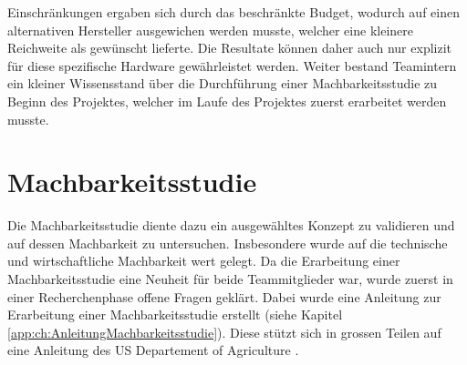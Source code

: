 Einschränkungen ergaben sich durch das beschränkte Budget, wodurch auf einen alternativen Hersteller ausgewichen werden musste, welcher eine kleinere Reichweite als gewünscht lieferte. Die Resultate können daher auch nur explizit für diese spezifische Hardware gewährleistet werden.
Weiter bestand Teamintern ein kleiner Wissensstand über die Durchführung einer Machbarkeitsstudie zu Beginn des Projektes, welcher im Laufe des Projektes zuerst erarbeitet werden musste.

\section{Machbarkeitsstudie}
Die Machbarkeitsstudie diente dazu ein ausgewähltes Konzept zu validieren und auf dessen Machbarkeit zu untersuchen. Insbesondere wurde auf die technische und wirtschaftliche Machbarkeit wert gelegt. Da die Erarbeitung einer Machbarkeitsstudie eine Neuheit für beide Teammitglieder war, wurde zuerst in einer Recherchenphase offene Fragen geklärt. Dabei wurde eine Anleitung zur Erarbeitung einer Machbarkeitsstudie erstellt (siehe Kapitel \ref{app:ch:AnleitungMachbarkeitsstudie}). Diese stützt sich in grossen Teilen auf eine Anleitung des US Departement of Agriculture \parencite{Matson2000}.
